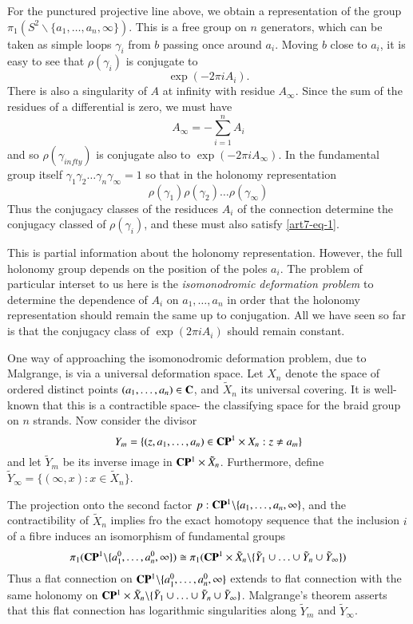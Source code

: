 For the punctured projective line above, we obtain a representation of the group $\pi_{1}(S^{2}\backslash \{a_{1}, \ldots, a_{n}, \infty\})$. This is a free group on $n$ generators, which can be taken as simple loops $\gamma_{i}$ from $b$ passing once around $a_{i}$. Moving $b$ close to $a_{i}$, it is easy to see that $ \rho(\gamma_{i})$ is conjugate to
$$
\exp(-2\pi iA_{i}).
$$
There is also a singularity of $A$ at infinity with residue $A_{\infty}$. Since the sum of the residues of a differential is zero, we must have
$$
A_{\infty} = -\sum\limits_{i=1}^{n}A_{i}
$$
and so $\rho(\gamma_{infty})$ is conjugate also to $\exp(-2\pi i A_{\infty})$. In the fundamental group itself $\gamma_{1} \gamma_{2}\ldots \gamma_{n}\gamma_{\infty} =1$ so that in the holonomy representation
\begin{equation}\label{art7-eq-1}
\rho(\gamma_{1})\rho(\gamma_{2})\ldots \rho(\gamma_{\infty})
\end{equation}
Thus the conjugacy classes of the residuces $A_{i}$ of the connection determine the conjugacy classed of
$\rho(\gamma_{i})$, and these must also satisfy \eqref{art7-eq-1}. 

This is partial information about the holonomy representation. However, the full holonomy group depends on the position of the poles $a_{i}$. The problem of particular interset to us here is the \textit{isomonodromic deformation problem} to determine the dependence of $A_{i}$ on $a_{1}, \ldots, a_{n}$ in order that the holonomy representation should remain the same up to conjugation. All we have seen so far is that the conjugacy class of $\exp(2\pi iA_{i})$ should remain constant.

One way of approaching the isomonodromic deformation problem, due to Malgrange, is via a universal deformation space. Let $X_{n}$ denote the space of ordered distinct points $(a_{1}, \ldots, a_{n}) \in \mathbf{C}$, and $\tilde{X}_{n}$ its universal covering. It is well-known that this is a contractible space- the classifying space for the braid group on $n$ strands. Now consider the divisor
$$
Y_{m}= \{(z,a_{1}, \ldots , a_{n}) \in \mathbf{C}\mathbf{P}^{1} \times X_{n}: z \neq a_{m}\}
$$
and let $\tilde{Y}_{m}$ be its inverse image in $\mathbf{C}\mathbf{P}^{1} \times \tilde{X}_{n}$. Furthermore,
define $\tilde{Y}_{\infty} = \{(\infty, x) : x \in \tilde{X}_{n}\}$.

The projection onto the second factor $p : \mathbf{C}\mathbf{P}^{1} \backslash \{a_{1}, \ldots ,a_{n}, \infty\}$, and the contractibility of $\tilde{X}_{n}$ implies fro  the exact homotopy sequence that the inclusion $i$ of a fibre induces an isomorphism of fundamental groups
$$
\pi_{1}(\mathbf{C}\mathbf{P}^{1} \backslash \{a_{1}^{0}, \ldots, a_{n}^{0}, \infty\})\cong \pi_{1} (\mathbf{C}\mathbf{P}^{1} \times \tilde{X}_{n} \backslash \{\tilde{Y}_{1} \cup \ldots\cup \tilde{Y}_{n}\cup  \tilde{Y}_{\infty}\})
$$
Thus a flat connection on $\mathbf{C}\mathbf{P}^{1}\backslash \{a_{1}^{0}, \ldots, a_{n}^{0}, \infty\}$ extends to flat connection  with the same holonomy on $\mathbf{C}\mathbf{P}^{1} \times \tilde{X}_{n} \backslash \{\tilde{Y}_{1} \cup \ldots\cup \tilde{Y}_{n} \cup  \tilde{Y}_{\infty}\}$. Malgrange's theorem asserts that this flat connection has logarithmic singularities along $\tilde{Y}_{m}$ and $\tilde{Y}_{\infty}$.

